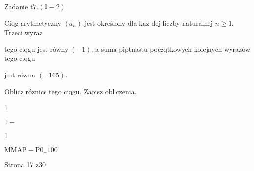 \documentclass[a4paper,12pt]{article}
\begin{document}
Zadanie $\mathrm{t}7. (0-2)$

Ciqg arytmetyczny $(a_{n})$ jest określony dla $\mathrm{k}\mathrm{a}\dot{\mathrm{z}}$ dej liczby naturalnej $n\geq 1$. Trzeci wyraz

tego ciqgu jest równy $(-1)$, a suma piptnastu poczqtkowych kolejnych wyrazów tego ciqgu

jest równa $(-165).$

Oblicz róznice tego ciqgu. Zapisz obliczenia.

1

$1-$

1

$\mathrm{M}\mathrm{M}\mathrm{A}\mathrm{P}-\mathrm{P}0_{-}100$

Strona 17 z30
\end{document}
